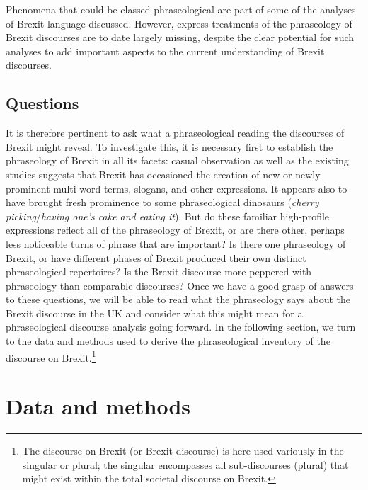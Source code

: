 \documentclass[output=paper]{langscibook}
\begin{document}
Phenomena that could be classed phraseological are part of some of the analyses of Brexit language discussed. However, express treatments of the phraseology of Brexit discourses are to date largely missing, despite the clear potential for such analyses to add important aspects to the current understanding of Brexit discourses.

\subsection{Questions}

It is therefore pertinent to ask what a phraseological reading the discourses of Brexit might reveal. To investigate this, it is necessary first to establish the phraseology of Brexit in all its facets: casual observation as well as the existing studies suggests that Brexit has occasioned the creation of new or newly prominent multi-word terms, slogans, and other expressions. It appears also to have brought fresh prominence to some phraseological dinosaurs (\textit{cherry picking}\slash\textit{having one’s cake and eating it}). But do these familiar high-profile expressions reflect all of the phraseology of Brexit, or are there other, perhaps less noticeable turns of phrase that are important? Is there one phraseology of Brexit, or have different phases of Brexit produced their own distinct phraseological repertoires? Is the Brexit discourse more peppered with phraseology than comparable discourses? Once we have a good grasp of answers to these questions, we will be able to read what the phraseology says about the Brexit discourse in the UK and consider what this might mean for a phraseological discourse analysis going forward. In the following section, we turn to the data and methods used to derive the phraseological inventory of the discourse on Brexit.\footnote{The discourse on Brexit (or Brexit discourse) is here used variously in the singular or plural; the singular encompasses all sub-discourses (plural) that might exist within the total societal discourse on Brexit.}

\section{Data and methods}
\end{document}
